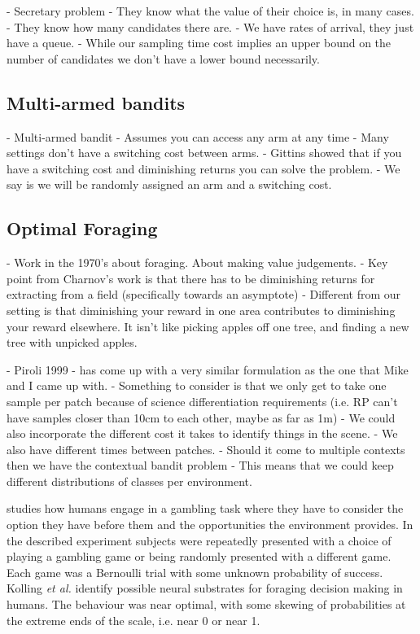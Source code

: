 		- Secretary problem
			- They know what the value of their choice is, in many cases.
			- They know how many candidates there are.
			- We have rates of arrival, they just have a queue.
			- While our sampling time cost implies an upper bound on the number of 
			candidates we don't have a lower bound necessarily.

\subsection{Multi-armed bandits}

		- Multi-armed bandit
			- Assumes you can access any arm at any time
			- Many settings don't have a switching cost between arms.
			- Gittins showed that if you have a switching cost and diminishing returns you can solve the problem.
			- We say is we will be randomly assigned an arm and a switching cost.

\subsection{Optimal Foraging}

	- Work in the 1970's about foraging.  About making value judgements.
		- Key point from Charnov's work is that there has to be diminishing returns
		for extracting from a field (specifically towards an asymptote)
		- Different from our setting is that diminishing your reward in one area 
		contributes to diminishing your reward elsewhere. It isn't like picking
		apples off one tree, and finding a new tree with unpicked apples.


	- Piroli 1999 - has come up with a very similar formulation as the one that 
		Mike and I came up with.
		- Something to consider is that we only get to take one sample per patch 
			because of science differentiation requirements (i.e. RP can't have 
			samples closer than 10cm to each other, maybe as far as 1m)
		- We could also incorporate the different cost it takes to identify things 
			in the scene.
		- We also have different times between patches.
		- Should it come to multiple contexts then we have the contextual bandit 
			problem
				- This means that we could keep different distributions of classes per 
					environment.

\cite{kolling2012neural} studies how humans engage in a gambling task where
they have to consider the option they have before them and the opportunities
the environment provides.  In the described experiment subjects were repeatedly
presented with a choice of playing a gambling game or being randomly presented
with a different game.  Each game was a Bernoulli trial with some unknown
probability of success.  Kolling \emph{et al.} identify possible neural
substrates for foraging decision making in humans.  The behaviour was near
optimal, with some skewing of probabilities at the extreme ends of the scale,
i.e. near 0 or near 1.


